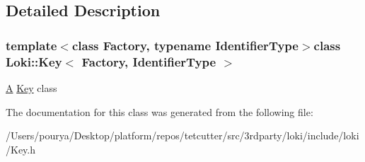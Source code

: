 \subsection{Detailed Description}
\subsubsection*{template$<$class Factory, typename Identifier\+Type$>$class Loki\+::\+Key$<$ Factory, Identifier\+Type $>$}

\hyperlink{structA}{A} \hyperlink{classLoki_1_1Key}{Key} class 

The documentation for this class was generated from the following file\+:\begin{DoxyCompactItemize}
\item 
/\+Users/pourya/\+Desktop/platform/repos/tetcutter/src/3rdparty/loki/include/loki/Key.\+h\end{DoxyCompactItemize}
